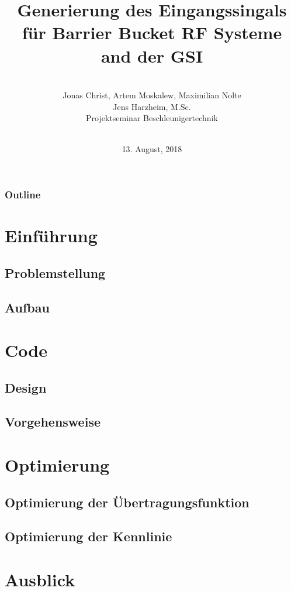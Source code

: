\documentclass[colorbacktitle,inverttitle,landscape,presentation,
	english,
	aspectratio=43, %
	accentcolor=tud9b, %
]{tudbeamer}
\date{13. August, 2018}
\title{Generierung des Eingangssingals für Barrier Bucket RF Systeme and der GSI }
\subtitle{\\[0.3\baselineskip]
	Jonas Christ, Artem Moskalew, Maximilian Nolte \\
{\small Jens Harzheim, M.Sc.}\\
[0.3\baselineskip]
{\tiny Projektseminar Beschleunigertechnik}\\[0.3em]
	\mbox{\scriptsize}~}
\institute[TU Darmstadt | Fachbereich 18 | Institut Theorie Elektromagnetischer Felder]{Institut für Theorie Elektromagnetischer Felder, TU Darmstadt}
\begin{document}
	
\begin{titleframe}
	\end{titleframe}
	
\begin{frame}
	\frametitle{Outline}
	\tableofcontents%
\end{frame}
	

\section{Einführung}

\subsection{Problemstellung}


\subsection{Aufbau}



\section{Code}

\subsection{Design}


\subsection{Vorgehensweise}




\section{Optimierung}
\subsection{Optimierung der Übertragungsfunktion}



\subsection{Optimierung der Kennlinie}


\section{Ausblick}
%






	
	
\end{document}
